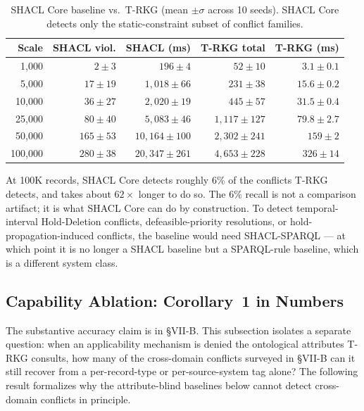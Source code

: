 \documentclass{ieeeaccess}
\begin{document}
\begin{table}[t]
\centering
\caption{SHACL Core baseline vs.\ T-RKG (mean $\pm \sigma$ across 10 seeds). SHACL Core detects only the static-constraint subset of conflict families.}
\label{tab:shacl}
\begin{tabular}{rrrrr}
\hline\hline
Scale & SHACL viol. & SHACL (ms) & T-RKG total & T-RKG (ms) \\
\hline
1{,}000   & $2 \pm 3$    & $196 \pm 4$       & $52 \pm 10$       & $3.1 \pm 0.1$ \\
5{,}000   & $17 \pm 19$  & $1{,}018 \pm 66$  & $231 \pm 38$      & $15.6 \pm 0.2$ \\
10{,}000  & $36 \pm 27$  & $2{,}020 \pm 19$  & $445 \pm 57$      & $31.5 \pm 0.4$ \\
25{,}000  & $80 \pm 40$  & $5{,}083 \pm 46$  & $1{,}117 \pm 127$ & $79.8 \pm 2.7$ \\
50{,}000  & $165 \pm 53$ & $10{,}164 \pm 100$ & $2{,}302 \pm 241$ & $159 \pm 2$ \\
100{,}000 & $280 \pm 38$ & $20{,}347 \pm 261$ & $4{,}653 \pm 228$ & $326 \pm 14$ \\
\hline\hline
\end{tabular}
\end{table}

At 100K records, SHACL Core detects roughly 6\% of the conflicts T-RKG detects, and takes about $62\times$ longer to do so. The 6\% recall is not a comparison artifact; it is what SHACL Core can do by construction. To detect temporal-interval Hold-Deletion conflicts, defeasible-priority resolutions, or hold-propagation-induced conflicts, the baseline would need SHACL-SPARQL --- at which point it is no longer a SHACL baseline but a SPARQL-rule baseline, which is a different system class.

\subsection{Capability Ablation: Corollary~1 in Numbers}
\label{sec:rq1}

The substantive accuracy claim is in §VII-B. This subsection isolates a separate question: when an applicability mechanism is denied the ontological attributes T-RKG consults, how many of the cross-domain conflicts surveyed in §VII-B can it still recover from a per-record-type or per-source-system tag alone? The following result formalizes why the attribute-blind baselines below cannot detect cross-domain conflicts in principle.
\end{document}
